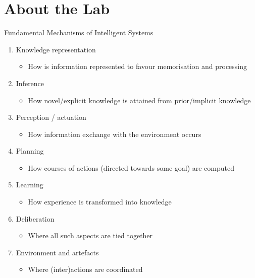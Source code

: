 \documentclass[presentation]{beamer}\mode<presentation>{\usetheme{AMSBolognaFC}}
\begin{document}
\section{About the Lab}

\begin{frame}[c,allowframebreaks]{Fundamental Mechanisms of Intelligent Systems}
%
\begin{enumerate}
	\item Knowledge representation 
	\begin{itemize}
		\item How is information represented to favour memorisation and processing
	\end{itemize}
	\item Inference 
	\begin{itemize}
		\item How novel/explicit knowledge is attained from prior/implicit knowledge
	\end{itemize}
	\item Perception / actuation 
	\begin{itemize}
		\item How information exchange with the environment occurs
	\end{itemize}
	\item Planning 
	\begin{itemize}
		\item How courses of actions (directed towards some goal) are computed
	\end{itemize}
	\item Learning 
	\begin{itemize}
		\item How experience is transformed into knowledge
	\end{itemize}
	\item Deliberation 
	\begin{itemize}
		\item Where all such aspects are tied together
	\end{itemize}
	\item Environment and artefacts 
	\begin{itemize}
		\item Where (inter)actions are coordinated
	\end{itemize}
\end{enumerate}

\end{frame}
\end{document}
